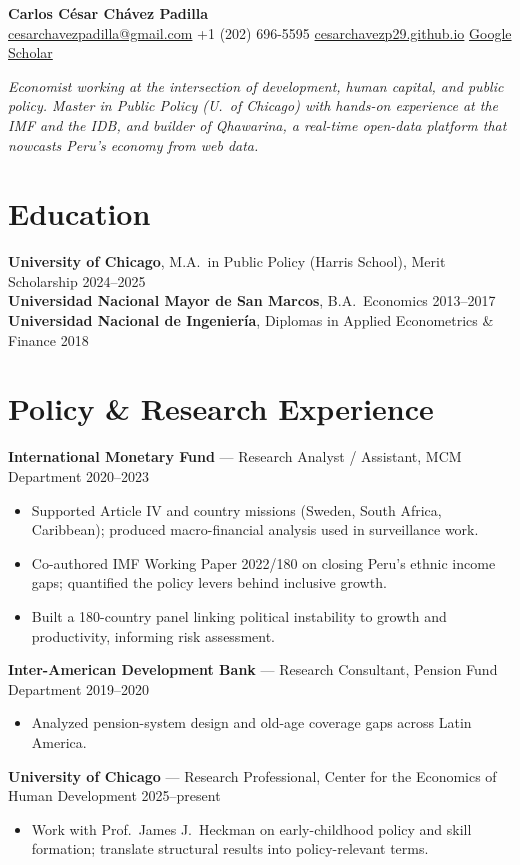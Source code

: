 \documentclass[10pt]{article}
\newcommand{\sep}{\;\textbar\;}
\begin{document}
\begin{center}
{\LARGE\bfseries\color{ink} Carlos César Chávez Padilla}\\[3pt]
\small \href{mailto:cesarchavezpadilla@gmail.com}{cesarchavezpadilla@gmail.com} \sep +1 (202) 696-5595 \sep
\href{https://cesarchavezp29.github.io}{cesarchavezp29.github.io} \sep
\href{https://scholar.google.com/citations?user=LsVe9yQAAAAJ}{Google Scholar}
\end{center}

\vspace{1pt}
{\small\itshape Economist working at the intersection of development, human capital, and public policy. Master in Public Policy (U.\ of Chicago) with hands-on experience at the IMF and the IDB, and builder of Qhawarina, a real-time open-data platform that nowcasts Peru's economy from web data.}

\section{Education}
\textbf{University of Chicago}, M.A.\ in Public Policy (Harris School), Merit Scholarship \hfill 2024--2025 \\
\textbf{Universidad Nacional Mayor de San Marcos}, B.A.\ Economics \hfill 2013--2017 \\
\textbf{Universidad Nacional de Ingeniería}, Diplomas in Applied Econometrics \& Finance \hfill 2018

\section{Policy \& Research Experience}
\textbf{International Monetary Fund} --- Research Analyst / Assistant, MCM Department \hfill 2020--2023
\begin{itemize}
\item Supported Article IV and country missions (Sweden, South Africa, Caribbean); produced macro-financial analysis used in surveillance work.
\item Co-authored IMF Working Paper 2022/180 on closing Peru's ethnic income gaps; quantified the policy levers behind inclusive growth.
\item Built a 180-country panel linking political instability to growth and productivity, informing risk assessment.
\end{itemize}
\textbf{Inter-American Development Bank} --- Research Consultant, Pension Fund Department \hfill 2019--2020
\begin{itemize}
\item Analyzed pension-system design and old-age coverage gaps across Latin America.
\end{itemize}
\textbf{University of Chicago} --- Research Professional, Center for the Economics of Human Development \hfill 2025--present
\begin{itemize}
\item Work with Prof.\ James J.\ Heckman on early-childhood policy and skill formation; translate structural results into policy-relevant terms.
\end{itemize}
\end{document}
